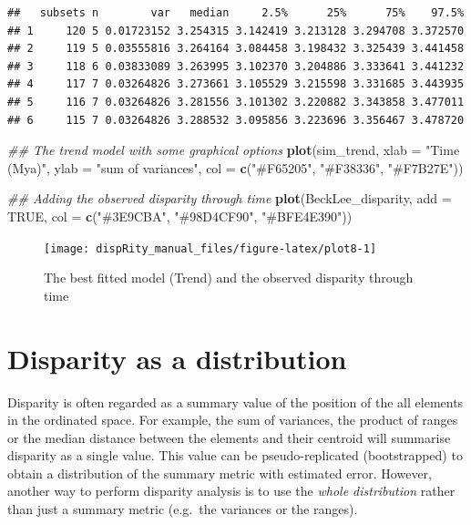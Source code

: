 \documentclass[
]{book}
\newenvironment{Shaded}{\begin{snugshade}}{\end{snugshade}}
\newcommand{\CommentTok}[1]{\textcolor[rgb]{0.56,0.35,0.01}{\textit{#1}}}
\newcommand{\DataTypeTok}[1]{\textcolor[rgb]{0.13,0.29,0.53}{#1}}
\newcommand{\KeywordTok}[1]{\textcolor[rgb]{0.13,0.29,0.53}{\textbf{#1}}}
\newcommand{\NormalTok}[1]{#1}
\newcommand{\OtherTok}[1]{\textcolor[rgb]{0.56,0.35,0.01}{#1}}
\newcommand{\StringTok}[1]{\textcolor[rgb]{0.31,0.60,0.02}{#1}}
\begin{document}
\begin{verbatim}
##   subsets n        var   median     2.5%      25%      75%    97.5%
## 1     120 5 0.01723152 3.254315 3.142419 3.213128 3.294708 3.372570
## 2     119 5 0.03555816 3.264164 3.084458 3.198432 3.325439 3.441458
## 3     118 6 0.03833089 3.263995 3.102370 3.204886 3.333641 3.441232
## 4     117 7 0.03264826 3.273661 3.105529 3.215598 3.331685 3.443935
## 5     116 7 0.03264826 3.281556 3.101302 3.220882 3.343858 3.477011
## 6     115 7 0.03264826 3.288532 3.095856 3.223696 3.356467 3.478720
\end{verbatim}

\begin{Shaded}
\begin{Highlighting}[]
\CommentTok{\#\# The trend model with some graphical options}
\KeywordTok{plot}\NormalTok{(sim\_trend, }\DataTypeTok{xlab =} \StringTok{"Time (Mya)"}\NormalTok{, }\DataTypeTok{ylab =} \StringTok{"sum of variances"}\NormalTok{,}
    \DataTypeTok{col =} \KeywordTok{c}\NormalTok{(}\StringTok{"\#F65205"}\NormalTok{, }\StringTok{"\#F38336"}\NormalTok{, }\StringTok{"\#F7B27E"}\NormalTok{))}

\CommentTok{\#\# Adding the observed disparity through time}
\KeywordTok{plot}\NormalTok{(BeckLee\_disparity, }\DataTypeTok{add =} \OtherTok{TRUE}\NormalTok{, }\DataTypeTok{col =} \KeywordTok{c}\NormalTok{(}\StringTok{"\#3E9CBA"}\NormalTok{, }\StringTok{"\#98D4CF90"}\NormalTok{, }\StringTok{"\#BFE4E390"}\NormalTok{))}
\end{Highlighting}
\end{Shaded}

\begin{figure}

{\centering \texttt{[image: dispRity\_manual\_files/figure-latex/plot8-1]} 

}

\caption{The best fitted model (Trend) and the observed disparity through time}\label{fig:plot8}
\end{figure}

\hypertarget{disparity-distribution}{%
\section{Disparity as a distribution}\label{disparity-distribution}}

Disparity is often regarded as a summary value of the position of the all elements in the ordinated space.
For example, the sum of variances, the product of ranges or the median distance between the elements and their centroid will summarise disparity as a single value.
This value can be pseudo-replicated (bootstrapped) to obtain a distribution of the summary metric with estimated error.
However, another way to perform disparity analysis is to use the \emph{whole distribution} rather than just a summary metric (e.g.~the variances or the ranges).
\end{document}
